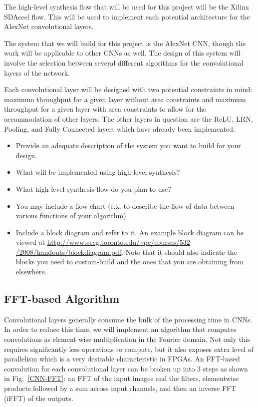 \documentclass[conference,compsoc]{IEEEtran/IEEEtran}
\begin{document}
The high-level synthesis flow that will be used for this project will be the Xilinx 
SDAccel flow. This will be used to implement each potential architecture for the 
AlexNet convolutional layers. 

The system that we will build for this project is the AlexNet CNN, though the work 
will be applicable to other CNNs as well. The design of this system will involve the 
selection between several different algorithms for the convolutional layers of the 
network. 

Each convolutional layer will be designed with two potential constraints in mind: 
maximum throughput for a given layer without area constraints and maximum throughput
for a given layer with area constraints to allow for the accommodation of other 
layers. The other layers in question are the ReLU, LRN, Pooling, and Fully Connected
layers which have already been implemented. 

\begin{itemize}
\item Provide an adequate description of the system you want to build for your design.
\item What will be implemented using high-level synthesis?
\item What high-level synthesis flow do you plan to use?
\item You may include a flow chart (e.x. to describe the flow of data between various functions of your algorithm)
\item Include a block diagram and refer to it.
An example block diagram can be viewed at \href{http://www.eecg.toronto.edu/~pc/courses/532/2008/handouts/blockdiagram.pdf}{http://www.eecg.toronto.edu/\~{}pc/courses/532 /2008/handouts/blockdiagram.pdf}.
Note that it should also indicate the blocks you need to custom-build and the ones that you are obtaining from elsewhere.
\end{itemize}

\subsection{FFT-based Algorithm}
Convolutional layers generally consume the bulk of the processing time in CNNs. In order to reduce this time, we will implement an algorithm that computes convolutions as element wise multiplication in the Fourier domain. Not only this requires significantly less operations to compute, but it also exposes extra level of parallelism which is a very desirable characteristic in FPGAs. An FFT-based convolution for each convolutional layer can be broken up into $3$ steps as shown in Fig.~\ref{CNN-FFT}: an FFT of the input images and the filters, elementwise products followed by a sum across input channels, and then an inverse FFT (iFFT) of the outputs.
\end{document}
